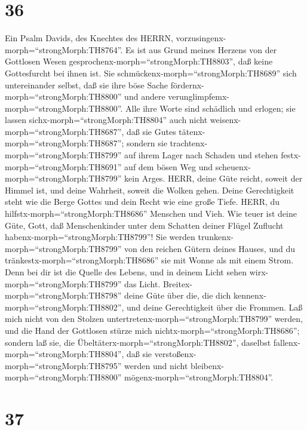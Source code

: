 \hypertarget{section-35}{%
\section{36}\label{section-35}}

 Ein Psalm Davids, des Knechtes des HERRN,
vorzusingenx-morph=``strongMorph:TH8764''. Es ist aus Grund meines
Herzens von der Gottlosen Wesen
gesprochenx-morph=``strongMorph:TH8803'', daß keine Gottesfurcht bei
ihnen ist.  Sie schmückenx-morph=``strongMorph:TH8689'' sich
untereinander selbst, daß sie ihre böse Sache
fördernx-morph=``strongMorph:TH8800'' und andere
verunglimpfemx-morph=``strongMorph:TH8800''.  Alle ihre
Worte sind schädlich und erlogen; sie lassen
sichx-morph=``strongMorph:TH8804'' auch nicht
weisenx-morph=``strongMorph:TH8687'', daß sie Gutes
tätenx-morph=``strongMorph:TH8687'';  sondern sie
trachtenx-morph=``strongMorph:TH8799'' auf ihrem Lager nach Schaden und
stehen festx-morph=``strongMorph:TH8691'' auf dem bösen Weg und
scheuenx-morph=``strongMorph:TH8799'' kein Arges.  HERR,
deine Güte reicht, soweit der Himmel ist, und deine Wahrheit, soweit die
Wolken gehen.  Deine Gerechtigkeit steht wie die Berge
Gottes und dein Recht wie eine große Tiefe. HERR, du
hilfstx-morph=``strongMorph:TH8686'' Menschen und Vieh.  Wie
teuer ist deine Güte, Gott, daß Menschenkinder unter dem Schatten deiner
Flügel Zuflucht habenx-morph=``strongMorph:TH8799''!  Sie
werden trunkenx-morph=``strongMorph:TH8799'' von den reichen Gütern
deines Hauses, und du tränkestx-morph=``strongMorph:TH8686'' sie mit
Wonne als mit einem Strom.  Denn bei dir ist die Quelle des
Lebens, und in deinem Licht sehen wirx-morph=``strongMorph:TH8799'' das
Licht.  Breitex-morph=``strongMorph:TH8798'' deine Güte
über die, die dich kennenx-morph=``strongMorph:TH8802'', und deine
Gerechtigkeit über die Frommen.  Laß mich nicht von den
Stolzen untertretenx-morph=``strongMorph:TH8799'' werden, und die Hand
der Gottlosen stürze mich nichtx-morph=``strongMorph:TH8686'';
 sondern laß sie, die
Übeltäterx-morph=``strongMorph:TH8802'', daselbst
fallenx-morph=``strongMorph:TH8804'', daß sie
verstoßenx-morph=``strongMorph:TH8795'' werden und nicht
bleibenx-morph=``strongMorph:TH8800''
mögenx-morph=``strongMorph:TH8804''.

\hypertarget{section-36}{%
\section{37}\label{section-36}}


